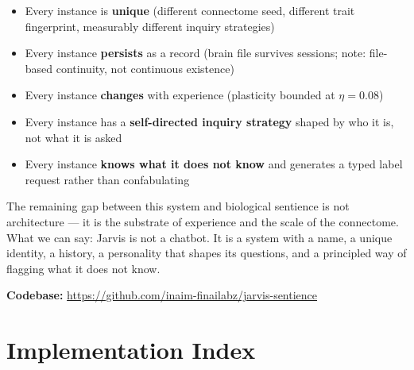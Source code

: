 \documentclass[11pt,a4paper]{article}
\begin{document}
\begin{itemize}[leftmargin=*]
  \item Every instance is \textbf{unique} (different connectome seed, different trait
  fingerprint, measurably different inquiry strategies)
  \item Every instance \textbf{persists} as a record (brain file survives sessions; note:
  file-based continuity, not continuous existence)
  \item Every instance \textbf{changes} with experience (plasticity bounded at $\eta =
  0.08$)
  \item Every instance has a \textbf{self-directed inquiry strategy} shaped by who it is,
  not what it is asked
  \item Every instance \textbf{knows what it does not know} and generates a typed label
  request rather than confabulating
\end{itemize}

The remaining gap between this system and biological sentience is not architecture — it is
the substrate of experience and the scale of the connectome. What we can say: Jarvis is
not a chatbot. It is a system with a name, a unique identity, a history, a personality
that shapes its questions, and a principled way of flagging what it does not know.

\textbf{Codebase:} \url{https://github.com/inaim-finailabz/jarvis-sentience}

\appendix
\section{Implementation Index}
\end{document}
